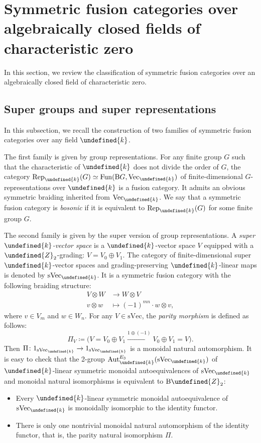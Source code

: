\documentclass[10pt]{article}
\let\mathbb\undefined
\theoremstyle{definition}
\numberwithin{equation}{section}
\numberwithin{thm}{section}
\newcommand{\bit}{\begin{itemize}}
\newcommand{\eit}{\end{itemize}}
\newcommand{\Zb}{\mathbb{Z}}
\newcommand{\bk}{\mathbb{k}}
\newcommand{\rmB}{\mathrm{B}}
\DeclareMathOperator{\Aut}{Aut}
\DeclareMathOperator{\fun}{Fun}
\newcommand{\vect}{\mathrm{Vec}}
\newcommand{\svect}{\mathrm{sVec}}
\newcommand{\rep}{\mathrm{Rep}}
\begin{document}
\section{Symmetric fusion categories over algebraically closed fields of characteristic zero} \label{sec_Deligne_symmetric_fusion}

In this section, we review the classification of symmetric fusion categories over an algebraically closed field of characteristic zero.

\subsection{Super groups and super representations}

In this subsection, we recall the construction of two families of symmetric fusion categories over any field $\bk$.

The first family is given by group representations. For any finite group $G$ such that the characteristic of $\bk$ does not divide the order of $G$, the category $\rep_\bk(G) \simeq \fun(\rmB G,\vect_\bk)$ of finite-dimensional $G$-representations over $\bk$ is a fusion category. It admits an obvious symmetric braiding inherited from $\vect_\bk$. We say that a symmetric fusion category is \emph{bosonic} if it is equivalent to $\rep_\bk(G)$ for some finite group $G$.

The second family is given by the super version of group representations. A \emph{super $\bk$-vector space} is a $\bk$-vector space $V$ equipped with a $\Zb_2$-grading: $V = V_0 \oplus V_1$. The category of finite-dimensional super $\bk$-vector spaces and grading-preserving $\bk$-linear maps is denoted by $\svect_\bk$. It is a symmetric fusion category with the following braiding structure:
\begin{align*}
V \otimes W & \to W \otimes V \\
v \otimes w & \mapsto (-1)^{mn} \cdot w \otimes v ,
\end{align*}
where $v \in V_m$ and $w \in W_n$. For any $V \in \svect$, the \emph{parity morphism} is defined as follows:
\[
\Pi_V \coloneqq \biggl( V = V_0 \oplus V_1 \xrightarrow{1 \oplus (-1)} V_0 \oplus V_1 = V \biggr) .
\]
Then $\Pi \colon 1_{\svect_\bk} \to 1_{\svect_\bk}$ is a monoidal natural automorphism. It is easy to check that the 2-group $\Aut^{E_3}_\bk(\svect_\bk)$ of $\bk$-linear symmetric monoidal autoequivalences of $\svect_\bk$ and monoidal natural isomorphisms is equivalent to $\mathrm B \Zb_2$:
\bit
\item Every $\bk$-linear symmetric monoidal autoequivalence of $\svect_\bk$ is monoidally isomorphic to the identity functor.
\item There is only one nontrivial monoidal natural automorphism of the identity functor, that is, the parity natural isomorphism $\Pi$.
\eit
\end{document}
